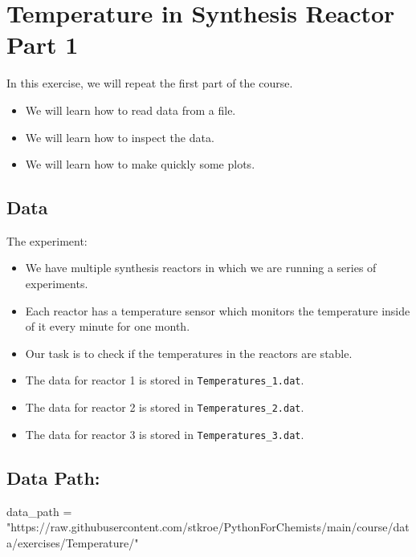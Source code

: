 \documentclass[
  letterpaper,
  DIV=11,
  numbers=noendperiod]{scrreprt}
\newenvironment{Shaded}{\begin{snugshade}}{\end{snugshade}}
\newcommand{\NormalTok}[1]{\textcolor[rgb]{0.00,0.23,0.31}{#1}}
\newcommand{\OperatorTok}[1]{\textcolor[rgb]{0.37,0.37,0.37}{#1}}
\newcommand{\StringTok}[1]{\textcolor[rgb]{0.13,0.47,0.30}{#1}}
\providecommand{\tightlist}{%
  \setlength{\itemsep}{0pt}\setlength{\parskip}{0pt}}\usepackage{longtable,booktabs,array}
\begin{document}
\section{Temperature in Synthesis Reactor Part
1}\label{temperature-in-synthesis-reactor-part-1}

In this exercise, we will repeat the first part of the course.

\begin{itemize}
\tightlist
\item
  We will learn how to read data from a file.
\item
  We will learn how to inspect the data.
\item
  We will learn how to make quickly some plots.
\end{itemize}

\subsection{Data}\label{data}

The experiment:

\begin{itemize}
\item
  We have multiple synthesis reactors in which we are running a series
  of experiments.
\item
  Each reactor has a temperature sensor which monitors the temperature
  inside of it every minute for one month.
\item
  Our task is to check if the temperatures in the reactors are stable.
\item
  The data for reactor 1 is stored in \texttt{Temperatures\_1.dat}.
\item
  The data for reactor 2 is stored in \texttt{Temperatures\_2.dat}.
\item
  The data for reactor 3 is stored in \texttt{Temperatures\_3.dat}.
\end{itemize}

\subsection{Data Path:}\label{data-path}

\begin{Shaded}
\begin{Highlighting}[]
\NormalTok{data\_path }\OperatorTok{=} \StringTok{"https://raw.githubusercontent.com/stkroe/PythonForChemists/main/course/data/exercises/Temperature/"}
\end{Highlighting}
\end{Shaded}
\end{document}
